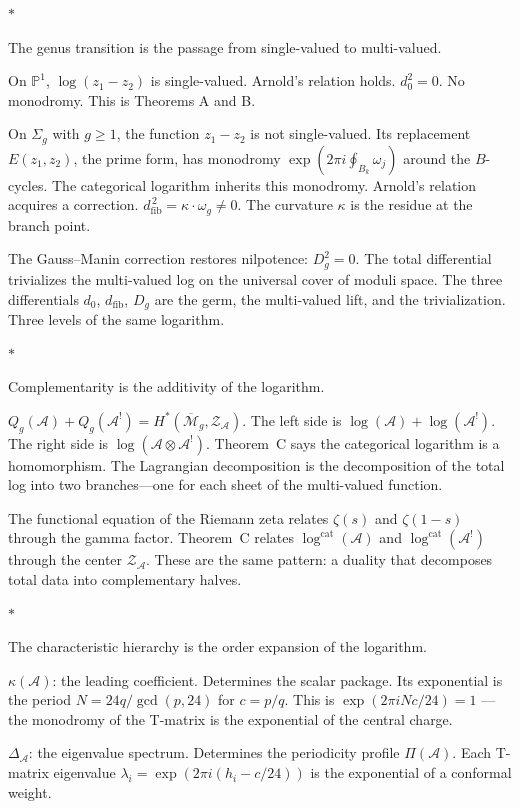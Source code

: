 \documentclass[11pt]{article}
\newcommand{\cA}{\mathcal{A}}
\newcommand{\cM}{\mathcal{M}}
\newcommand{\cZ}{\mathcal{Z}}
\newcommand{\bP}{\mathbb{P}}
\newcommand{\dzero}{d_0}
\newcommand{\dfib}{d_{\mathrm{fib}}}
\newcommand{\Dg}[1]{D_{#1}}
\newcommand{\sep}{\bigskip\begin{center}$*$\end{center}\medskip}
\begin{document}
\sep

The genus transition is the passage from single-valued to multi-valued.

On $\bP^1$, $\log(z_1 - z_2)$ is single-valued.  Arnold's relation
holds.  $\dzero^2 = 0$.  No monodromy.  This is Theorems A and B.

On $\Sigma_g$ with $g \geq 1$, the function $z_1 - z_2$ is not
single-valued.  Its replacement $E(z_1, z_2)$, the prime form,
has monodromy $\exp(2\pi i \oint_{B_k} \omega_j)$ around the
$B$-cycles.  The categorical logarithm inherits this monodromy.
Arnold's relation acquires a correction.  $\dfib^{\,2} =
\kappa \cdot \omega_g \neq 0$.  The curvature $\kappa$ is the
residue at the branch point.

The Gauss--Manin correction restores nilpotence: $\Dg{g}^2 = 0$.
The total differential trivializes the multi-valued log on the
universal cover of moduli space.  The three differentials $\dzero$,
$\dfib$, $\Dg{g}$ are the germ, the multi-valued lift, and the
trivialization.  Three levels of the same logarithm.

\sep

Complementarity is the additivity of the logarithm.

$Q_g(\cA) + Q_g(\cA^!) = H^*(\overline{\cM}_g, \cZ_\cA)$.  The
left side is $\log(\cA) + \log(\cA^!)$.  The right side is
$\log(\cA \otimes \cA^!)$.  Theorem~C says the categorical
logarithm is a homomorphism.  The Lagrangian decomposition is the
decomposition of the total log into two branches---one for each sheet
of the multi-valued function.

The functional equation of the Riemann zeta relates $\zeta(s)$ and
$\zeta(1-s)$ through the gamma factor.  Theorem~C relates
$\log^{\mathrm{cat}}(\cA)$ and $\log^{\mathrm{cat}}(\cA^!)$ through
the center $\cZ_\cA$.  These are the same pattern: a duality that
decomposes total data into complementary halves.

\sep

The characteristic hierarchy is the order expansion of the
logarithm.

$\kappa(\cA)$: the leading coefficient.  Determines the scalar
package.  Its exponential is the period $N = 24q/\gcd(p,24)$ for
$c = p/q$.  This is $\exp(2\pi i N c/24) = 1$ --- the monodromy
of the T-matrix is the exponential of the central charge.

$\Delta_\cA$: the eigenvalue spectrum.  Determines the periodicity
profile $\Pi(\cA)$.  Each T-matrix eigenvalue $\lambda_i =
\exp(2\pi i(h_i - c/24))$ is the exponential of a conformal weight.
\end{document}
